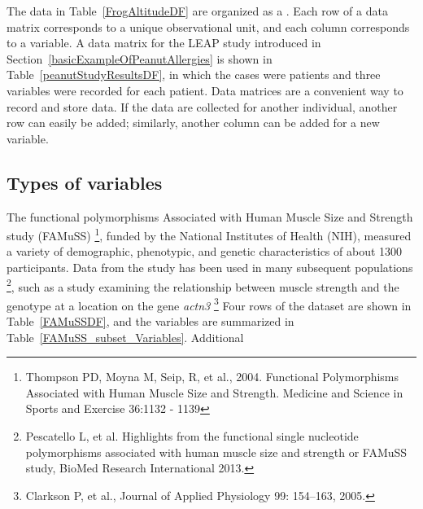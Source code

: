 \begin{doublespace}
The data in Table~\ref{FrogAltitudeDF} are organized as a . Each row of a data matrix corresponds to a unique observational unit, and each column corresponds to a variable. A data matrix for the LEAP study introduced in Section~\ref{basicExampleOfPeanutAllergies} is shown in Table~\vref{peanutStudyResultsDF}, in which the cases were patients and three variables were recorded for each patient. Data matrices are a convenient way to record and store data. If the data are collected for another individual, another row can easily be added; similarly, another column can be added for a new variable.



\subsection{Types of variables}
\label{variableTypes}


The functional polymorphisms Associated with Human Muscle Size and Strength study (FAMuSS) \footnote{Thompson PD, Moyna M, Seip, R, et al., 2004.  Functional Polymorphisms Associated with Human Muscle Size and Strength.  Medicine and Science in Sports and Exercise 36:1132 - 1139}, funded by the National Institutes of Health (NIH), measured a variety of demographic, phenotypic, and genetic characteristics of about 1300 participants. Data from the study has been used in many subsequent populations \footnote{Pescatello L, et al. Highlights from the functional single nucleotide polymorphisms associated with human muscle size and strength or FAMuSS study, BioMed Research International 2013.}, such as a study examining the relationship between muscle strength and the genotype at a location on the gene \textsl{actn3} \footnote{Clarkson P, et al., Journal of Applied Physiology 99: 154–163, 2005.} Four rows of the  dataset are shown in Table~\ref{FAMuSSDF}, and the variables are summarized in Table~\ref{FAMuSS_subset_Variables}.  Additional 



\end{doublespace}

